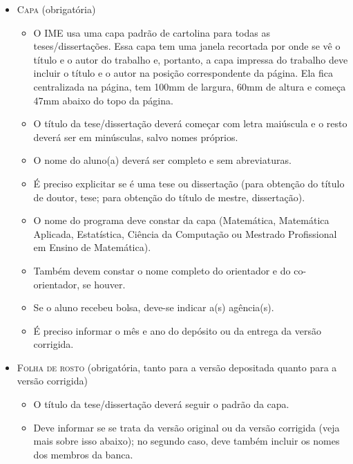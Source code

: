 \begin{itemize}
  \item \textsc{Capa} (obrigatória)
  \begin{itemize}
    \item O IME usa uma capa padrão de cartolina para todas as
    teses/dissertações. Essa capa tem uma janela recortada por onde se
    vê o título e o autor do trabalho e, portanto, a capa impressa do
    trabalho deve incluir o título e o autor na posição correspondente da
    página. Ela fica centralizada na página, tem 100mm de largura, 60mm de
    altura e começa 47mm abaixo do topo da página.

    \item O título da tese/dissertação deverá começar com letra maiúscula
    e o resto deverá ser em minúsculas, salvo nomes próprios.

    \item O nome do aluno(a) deverá ser completo e sem abreviaturas.

    \item É preciso explicitar se é uma tese ou dissertação (para
    obtenção do título de doutor, tese; para obtenção do título de
    mestre, dissertação).

    \item O nome do programa deve constar da capa (Matemática,
    Matemática Aplicada, Estatística, Ciência da Computação ou
    Mestrado Profissional em Ensino de Matemática).

    \item Também devem constar o nome completo do orientador e do
    co-orientador, se houver.

    \item Se o aluno recebeu bolsa, deve-se indicar a(s) agência(s).

    \item É preciso informar o mês e ano do depósito ou da entrega da
    versão corrigida.
  \end{itemize}

  \pagebreak %

  \item \textsc{Folha de rosto} (obrigatória, tanto para a versão
  depositada quanto para a versão corrigida)
  \begin{itemize}
    \item O título da tese/dissertação deverá seguir o padrão da capa.

    \item Deve informar se se trata da versão original ou da versão
    corrigida (veja mais sobre isso abaixo); no segundo caso, deve
    também incluir os nomes dos membros da banca.
  \end{itemize}


\end{itemize}

